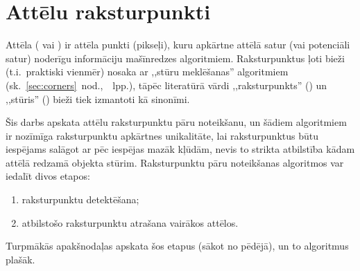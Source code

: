 \section{Attēlu raksturpunkti} \label{sec:algo}
Attēla  ( vai )
ir attēla punkti (pikseļi), kuru apkārtne attēlā 
satur (vai potenciāli satur) noderīgu informāciju mašīnredzes algoritmiem.
Raksturpunktus ļoti bieži (t.i.~praktiski vienmēr)
nosaka ar ,,stūru meklēšanas'' algoritmiem
(sk.~\ref{sec:corners}~nod.,~\pageref{sec:corners}~lpp.),
tāpēc literatūrā vārdi ,,raksturpunkts'' () un ,,stūris''
() bieži tiek izmantoti kā sinonīmi.

Šis darbs apskata attēlu raksturpunktu pāru noteikšanu, un šādiem
algoritmiem ir
nozīmīga raksturpunktu apkārtnes unikalitāte,
lai raksturpunktus būtu iespējams salāgot ar pēc iespējas mazāk kļūdām,
nevis to strikta atbilstība kādam attēlā redzamā objekta stūrim.
Raksturpunktu pāru noteikšanas algoritmos var iedalīt divos etapos:
\begin{enumerate}
	\item raksturpunktu detektēšana;
	\item atbilstošo raksturpunktu atrašana vairākos attēlos.
\end{enumerate}
Turpmākās apakšnodaļas apskata šos etapus (sākot no pēdējā),
un to algoritmus plašāk.



